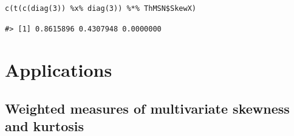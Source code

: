 \begin{verbatim}
c(t(c(diag(3)) %x% diag(3)) %*% ThMSN$SkewX)
\end{verbatim}

\begin{verbatim}
#> [1] 0.8615896 0.4307948 0.0000000
\end{verbatim}

\hypertarget{applications}{%
\section{Applications}\label{applications}}

\hypertarget{weighted-measures-of-multivariate-skewness-and-kurtosis}{%
\subsection{Weighted measures of multivariate skewness and kurtosis}\label{weighted-measures-of-multivariate-skewness-and-kurtosis}}


